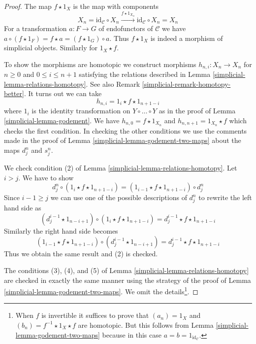 \begin{proof}

The map $f \star 1_X$ is the map with components
$$
X_n = \text{id}_\mathcal{C} \circ X_n
\xrightarrow{f \star 1_{X_n}}
\text{id}_\mathcal{C} \circ X_n = X_n
$$
For a transformation $a : F \to G$ of endofunctors of $\mathcal{C}$ we have
$a \circ (f \star 1_F) = f \star a = (f \star 1_G) \circ a$. Thus $f \star 1_X$
is indeed a morphism of simplicial objects. Similarly for $1_X \star f$.

\medskip\noindent
To show the morphisms are homotopic we construct
morphisms $h_{n, i} : X_n \to X_n$ for $n \geq 0$ and $0 \leq i \leq n + 1$
satisfying the relations described in Lemma \ref{simplicial-lemma-relations-homotopy}.
See also Remark \ref{simplicial-remark-homotopy-better}. It turns out we can take
$$
h_{n, i} = 1_i \star f \star 1_{n + 1 - i}
$$
where $1_i$ is the identity transformation on $Y \circ \ldots \circ Y$
as in the proof of Lemma \ref{simplicial-lemma-godement}. We have
$h_{n, 0} = f \star 1_{X_n}$ and $h_{n, n + 1} = 1_{X_n} \star f$
which checks the first condition. In checking the other conditions
we use the comments made in the proof of
Lemma \ref{simplicial-lemma-godement-two-maps} about the maps $d^n_j$ and $s^n_j$.

\medskip\noindent
We check condition (2) of Lemma \ref{simplicial-lemma-relations-homotopy}.
Let $i > j$. We have to show
$$
d^n_j \circ (1_i \star f \star 1_{n + 1 - i}) =
(1_{i - 1} \star f \star 1_{n + 1 - i}) \circ d^n_j
$$
Since $i - 1 \geq j$ we can use one of the possible descriptions of
$d^n_j$ to rewrite the left hand side as
$$
(d^{i - 1}_j \star 1_{n - i + 1}) \circ (1_i \star f \star 1_{n + 1 - i}) =
d^{i - 1}_j \star f \star 1_{n + 1 - i}
$$
Similarly the right hand side becomes
$$
(1_{i - 1} \star f \star 1_{n + 1 - i}) \circ
(d^{i - 1}_j \star 1_{n - i + 1}) =
d^{i - 1}_j \star f \star 1_{n + 1 - i}
$$
Thus we obtain the same result and (2) is checked.

\medskip\noindent
The conditions (3), (4), and (5) of Lemma \ref{simplicial-lemma-relations-homotopy}
are checked in exactly the same manner using the strategy of the proof
of Lemma \ref{simplicial-lemma-godement-two-maps}. We omit the details\footnote{When
$f$ is invertible it suffices to prove that $(a_n) = 1_X$ and
$(b_n) = f^{-1} \star 1_X \star f$ are homotopic.
But this follows from Lemma \ref{simplicial-lemma-godement-two-maps}
because in this case $a = b = 1_{\text{id}_\mathcal{C}}$.}.
\end{proof}

